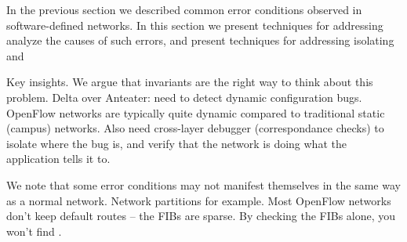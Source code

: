 
In the previous section we described common error conditions observed in
software-defined networks. In this section we present techniques for
addressing 
analyze the causes of such
errors, and present techniques for addressing isolating and

Key insights. We argue that invariants are the right way to think about this
problem. Delta over Anteater: need to detect dynamic configuration bugs.
OpenFlow networks are typically quite dynamic compared to traditional static
(campus) networks. Also need cross-layer debugger (correspondance checks) to isolate where the bug is,
and verify that the network is doing what the application tells it to.



We note that some error conditions may not manifest themselves in the same way
as a normal network. Network partitions for example. Most OpenFlow networks
don't keep default routes -- the FIBs are sparse. By checking the FIBs alone,
you won't find .



